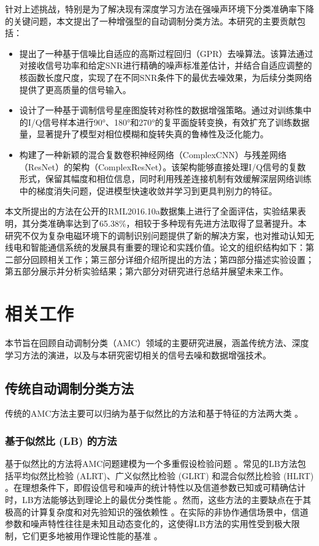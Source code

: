 \documentclass[conference]{IEEEtran}
\begin{document}
针对上述挑战，特别是为了解决现有深度学习方法在强噪声环境下分类准确率下降的关键问题，本文提出了一种增强型的自动调制分类方法。本研究的主要贡献包括：
\begin{itemize}
    \item 提出了一种基于信噪比自适应的高斯过程回归（GPR）去噪算法。该算法通过对接收信号功率和给定SNR进行精确的噪声标准差估计，并结合自适应调整的核函数长度尺度，实现了在不同SNR条件下的最优去噪效果，为后续分类网络提供了更高质量的信号输入。
    \item 设计了一种基于调制信号星座图旋转对称性的数据增强策略。通过对训练集中的I/Q信号样本进行90°、180°和270°的复平面旋转变换，有效扩充了训练数据量，显著提升了模型对相位模糊和旋转失真的鲁棒性及泛化能力。
    \item 构建了一种新颖的混合复数卷积神经网络（ComplexCNN）与残差网络（ResNet）的架构（ComplexResNet）。该架构能够直接处理I/Q信号的复数形式，保留其幅度和相位信息，同时利用残差连接机制有效缓解深层网络训练中的梯度消失问题，促进模型快速收敛并学习到更具判别力的特征。
\end{itemize}
本文所提出的方法在公开的RML2016.10a数据集上进行了全面评估，实验结果表明，其分类准确率达到了65.38\%，相较于多种现有先进方法取得了显著提升。本研究不仅为复杂电磁环境下的调制识别问题提供了新的解决方案，也对推动认知无线电和智能通信系统的发展具有重要的理论和实践价值。论文的组织结构如下：第二部分回顾相关工作；第三部分详细介绍所提出的方法；第四部分描述实验设置；第五部分展示并分析实验结果；第六部分对研究进行总结并展望未来工作。

\section{相关工作}
本节旨在回顾自动调制分类（AMC）领域的主要研究进展，涵盖传统方法、深度学习方法的演进，以及与本研究密切相关的信号去噪和数据增强技术。

\subsection{传统自动调制分类方法}
传统的AMC方法主要可以归纳为基于似然比的方法和基于特征的方法两大类 \cite{[5]}\cite{[10]}。

\subsubsection{基于似然比 (LB) 的方法}
基于似然比的方法将AMC问题建模为一个多重假设检验问题 \cite{[5]}\cite{[8]}。常见的LB方法包括平均似然比检验 (ALRT)、广义似然比检验 (GLRT) 和混合似然比检验 (HLRT) \cite{[5]}\cite{[32]}。在理想条件下，即假设信号和噪声的统计特性以及信道参数已知或可精确估计时，LB方法能够达到理论上的最优分类性能 \cite{[10]}\cite{[32]}。然而，这些方法的主要缺点在于其极高的计算复杂度和对先验知识的强依赖性 \cite{[5]}\cite{[8]}\cite{[9]}。在实际的非协作通信场景中，信道参数和噪声特性往往是未知且动态变化的，这使得LB方法的实用性受到极大限制，它们更多地被用作理论性能的基准 \cite{[5]}。
\end{document}
